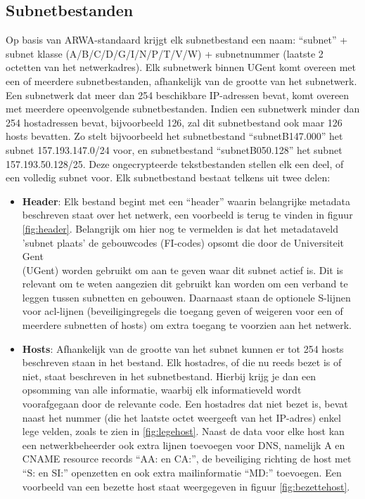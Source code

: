 \subsection{Subnetbestanden}
\label{subnetbestanden}
Op basis van ARWA-standaard krijgt elk subnetbestand een naam: “subnet” + subnet klasse (A/B/C/D/G/I/N/P/T/V/W) + subnetnummer (laatste 2 octetten van het netwerkadres). Elk subnetwerk binnen UGent komt overeen met een of meerdere subnetbestanden, afhankelijk van de grootte van het subnetwerk. Een subnetwerk dat meer dan 254 beschikbare IP-adressen bevat, komt overeen met meerdere opeenvolgende subnetbestanden. Indien een subnetwerk minder dan 254 hostadressen bevat, bijvoorbeeld 126, zal dit subnetbestand ook maar 126 hosts bevatten.
Zo stelt bijvoorbeeld het subnetbestand “subnetB147.000” het subnet 157.193.147.0/24 voor, en subnetbestand “subnetB050.128” het subnet 157.193.50.128/25. Deze ongecrypteerde tekstbestanden stellen elk een deel, of een volledig subnet voor. Elk subnetbestand bestaat telkens uit twee delen: 
\begin{itemize}
    \item \textbf{Header}: Elk bestand begint met een “header” waarin belangrijke metadata beschreven staat over het netwerk, een voorbeeld is terug te vinden in figuur \ref{fig:header}. Belangrijk om hier nog te vermelden is dat het metadataveld 'subnet plaats' de gebouwcodes (FI-codes) opsomt die door de Universiteit Gent \\(UGent) worden gebruikt om aan te geven waar dit subnet actief is. Dit is relevant om te weten aangezien dit gebruikt kan worden om een verband te leggen tussen subnetten en gebouwen. Daarnaast staan de optionele S-lijnen voor \acrfull{acl}-lijnen (beveiligingregels die toegang geven of weigeren voor een of meerdere subnetten of hosts) om extra toegang te voorzien aan het netwerk. 
    \item \textbf{Hosts}: Afhankelijk van de grootte van het subnet kunnen er tot 254 hosts beschreven staan in het bestand. Elk hostadres, of die nu reeds bezet is of niet, staat beschreven in het subnetbestand. Hierbij krijg je dan een opsomming van alle informatie, waarbij elk informatieveld wordt voorafgegaan door de relevante code. Een hostadres dat niet bezet is, bevat naast het nummer (die het laatste octet weergeeft van het IP-adres) enkel lege velden, zoals te zien in \ref{fig:legehost}. Naast de data voor elke host kan een netwerkbeheerder ook extra lijnen toevoegen voor DNS, namelijk A en CNAME resource records “AA: en CA:”, de beveiliging richting de host met “S: en SI:” openzetten en ook extra mailinformatie “MD:” toevoegen. Een voorbeeld van een bezette host staat weergegeven in figuur \ref{fig:bezettehost}.
\end{itemize}

